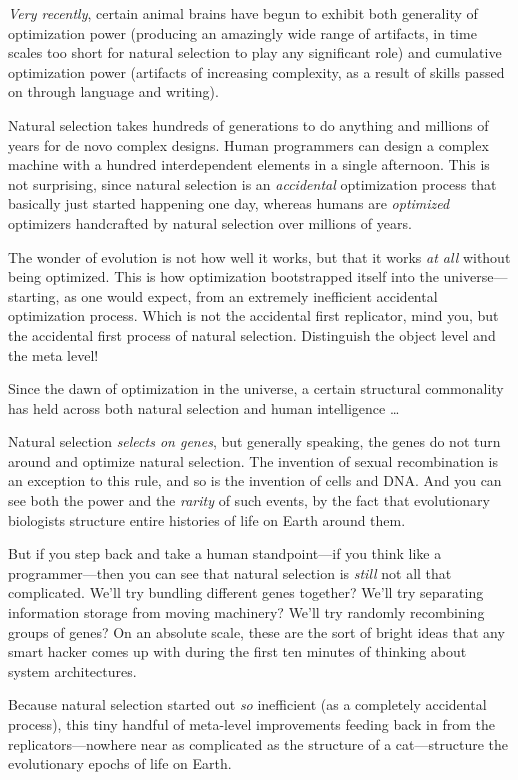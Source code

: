 {
 \textit{Very recently}, certain animal brains have begun to
exhibit both generality of optimization power (producing an amazingly
wide range of artifacts, in time scales too short for natural selection
to play any significant role) and cumulative optimization power
(artifacts of increasing complexity, as a result of skills passed on
through language and writing).}

{
 Natural selection takes hundreds of generations to do anything and
millions of years for de novo complex designs. Human programmers can
design a complex machine with a hundred interdependent elements in a
single afternoon. This is not surprising, since natural selection is an
\textit{accidental} optimization process that basically just started
happening one day, whereas humans are \textit{optimized} optimizers
handcrafted by natural selection over millions of years.}

{
 The wonder of evolution is not how well it works, but that it
works \textit{at all} without being optimized. This is how optimization
bootstrapped itself into the universe---starting, as one would expect,
from an extremely inefficient accidental optimization process. Which is
not the accidental first replicator, mind you, but the accidental first
process of natural selection. Distinguish the object level and the meta
level!}

{
 Since the dawn of optimization in the universe, a certain
structural commonality has held across both natural selection and human
intelligence \ldots}

{
 Natural selection \textit{selects on genes}, but generally
speaking, the genes do not turn around and optimize natural selection.
The invention of sexual recombination is an exception to this rule, and
so is the invention of cells and DNA. And you can see both the power
and the \textit{rarity} of such events, by the fact that evolutionary
biologists structure entire histories of life on Earth around them.}

{
 But if you step back and take a human standpoint---if you think
like a programmer---then you can see that natural selection is
\textit{still} not all that complicated. We'll try
bundling different genes together? We'll try separating
information storage from moving machinery? We'll try
randomly recombining groups of genes? On an absolute scale, these are
the sort of bright ideas that any smart hacker comes up with during the
first ten minutes of thinking about system architectures.}

{
 Because natural selection started out \textit{so} inefficient (as
a completely accidental process), this tiny handful of meta-level
improvements feeding back in from the replicators---nowhere near as
complicated as the structure of a cat---structure the evolutionary
epochs of life on Earth.}

